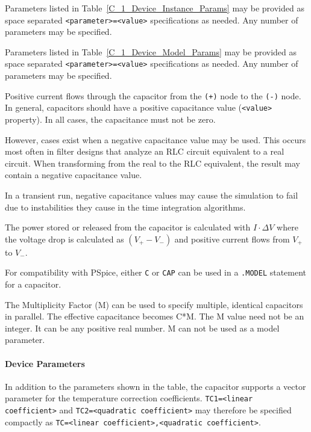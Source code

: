 \begin{Device}
\begin{Parameters}
Parameters listed in Table~\ref{C_1_Device_Instance_Params} may be provided as
space separated \texttt{<parameter>=<value>} specifications as needed.  Any number
of parameters may be specified.

Parameters listed in Table~\ref{C_1_Device_Model_Params} may be provided as
space separated \texttt{<parameter>=<value>} specifications as needed.  Any number
of parameters may be specified.

\end{Parameters}

\comments
Positive current flows through the capacitor from
the \texttt{(+)} node to the \texttt{(-)} node.  In general, capacitors should
have a positive capacitance value (\texttt{<value>} property). In all cases,
the capacitance must not be zero.  

However, cases exist when a negative capacitance value may be used. This occurs
most often in filter designs that analyze an RLC circuit equivalent to a real
circuit. When transforming from the real to the RLC equivalent, the result may
contain a negative capacitance value.

In a transient run, negative capacitance values may cause the simulation to
fail due to instabilities they cause in the time integration
algorithms.

The power stored or released from the capacitor is calculated 
with $I \cdot \Delta V$ where the voltage drop is calculated as $(V_+ - V_-)$ 
and positive current flows from $V_+$ to $V_-$.

For compatibility with PSpice, either \texttt{C} or \texttt{CAP} can be used in a
\texttt{.MODEL} statement for a capacitor. 

The Multiplicity Factor (M) can be used to specify multiple, identical capacitors
in parallel. The effective capacitance becomes C*M. The M value need not be an
integer. It can be any positive real number. M can not be used as a model
parameter.

\end{Device}

\paragraph{Device Parameters}



In addition to the parameters shown in the table, the capacitor supports a
vector parameter for the temperature correction coefficients.
\texttt{TC1=<linear coefficient>} and \texttt{TC2=<quadratic coefficient>} may
therefore be specified compactly as \texttt{TC=<linear coefficient>,<quadratic
coefficient>}.

